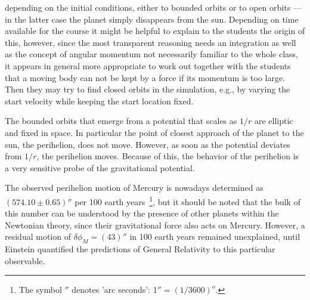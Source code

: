 \documentclass[12pt]{iopart}
\begin{document}
 depending on the initial conditions, either to bounded orbits or to open orbits --- in the latter case the planet simply disappears from the sun.
Depending on time available for the course  it might be helpful to explain to the students the origin of this, however, since the most transparent reasoning needs an integration as well as the concept of angular momentum not necessarily familiar to the whole class, it appears in general more appropriate to work out together with the students that a moving body can not be kept by a force if its momentum is too large.
Then they may try to find closed orbits in the simulation, e.g., by varying the start velocity while keeping the start location fixed.

The bounded orbits that emerge from a potential that scales as $1/r$ are elliptic and fixed in space.
In particular the point of closest approach of the planet to the sun, the perihelion, does not move.
However, as soon as the potential deviates from $1/r$, the perihelion moves. Because of this, the behavior of the perihelion
is a very sensitive probe of the gravitational potential. 

The observed perihelion motion of Mercury is nowadays determined as $(574.10\pm 0.65)''$ per
100 earth years~\footnote{The symbol $''$ denotes 'arc seconds': 1$''=(1/3600)^o$. }, but it should be noted that the bulk of this number
can be understood by the presence of other planets within the Newtonian theory, since
their gravitational force also acts on Mercury. However, a
residual motion of $\delta \phi_M = (43)''$ in 100 earth years remained unexplained, until Einstein quantified the
predictions of General Relativity to this particular observable. 
\end{document}
